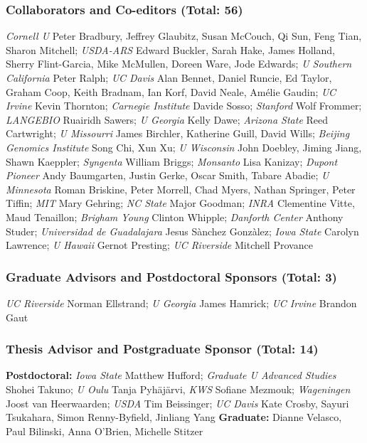 \documentclass[10pt]{article}
\begin{document}
\subsubsection*{Collaborators and Co-editors (Total: 56)}
\emph{Cornell U} Peter Bradbury, Jeffrey Glaubitz, Susan McCouch, Qi Sun, Feng Tian, Sharon Mitchell;
\emph{USDA-ARS} Edward Buckler, Sarah Hake, James Holland, Sherry Flint-Garcia, Mike McMullen, Doreen Ware, Jode Edwards;
\emph{U Southern California} Peter Ralph;
\emph{UC Davis} Alan Bennet, Daniel Runcie, Ed Taylor, Graham Coop, Keith Bradnam, Ian Korf, David Neale, Am\'elie Gaudin;
\emph{UC Irvine} Kevin Thornton;
\emph{Carnegie Institute} Davide Sosso;
\emph{Stanford} Wolf Frommer;
\emph{LANGEBIO} Ruairidh Sawers;
\emph{U Georgia} Kelly Dawe;
\emph{Arizona State} Reed Cartwright;
\emph{U Missourri} James Birchler, Katherine Guill, David Wills;
\emph{Beijing Genomics Institute} Song Chi, Xun Xu;
\emph{U Wisconsin} John Doebley, Jiming Jiang, Shawn Kaeppler;
\emph{Syngenta} William Briggs;
\emph{Monsanto} Lisa Kanizay;
\emph{Dupont Pioneer} Andy Baumgarten, Justin Gerke, Oscar Smith, Tabare Abadie;
\emph{U Minnesota} Roman Briskine, Peter Morrell, Chad Myers, Nathan Springer, Peter Tiffin;
\emph{MIT} Mary Gehring; 
\emph{NC State} Major Goodman; 
\emph{INRA} Clementine Vitte, Maud Tenaillon; 
\emph{Brigham Young} Clinton Whipple; 
\emph{Danforth Center} Anthony Studer; 
\emph{Universidad de Guadalajara} Jesus S\`anchez Gonz\`alez; 
\emph{Iowa State} Carolyn Lawrence; 
\emph{U Hawaii} Gernot Presting; 
\emph{UC Riverside} Mitchell Provance \\ 

\subsubsection*{Graduate Advisors and Postdoctoral Sponsors (Total: 3)}
\emph{UC Riverside} Norman Ellstrand; \emph{U Georgia} James Hamrick; \emph{UC Irvine} Brandon Gaut 

\subsubsection*{Thesis Advisor and Postgraduate Sponsor (Total: 14)}
{\bf Postdoctoral:} \emph{Iowa State} Matthew Hufford; \emph{Graduate U Advanced Studies} Shohei Takuno; \emph{U Oulu} Tanja Pyh\"aj\"arvi, \emph{KWS} Sofiane Mezmouk; \emph{Wageningen} Joost van Heerwaarden; \emph{USDA} Tim Beissinger; \emph{UC Davis} Kate Crosby, Sayuri Tsukahara, Simon Renny-Byfield, Jinliang Yang {\bf Graduate:} Dianne Velasco, Paul Bilinski, Anna O'Brien, Michelle Stitzer
\end{document}
